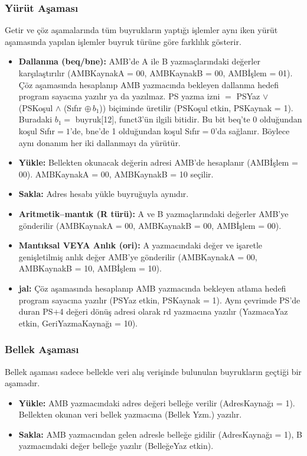 \subsubsection{Yürüt Aşaması}

Getir ve çöz aşamalarında tüm buyrukların yaptığı işlemler aynı iken yürüt aşamasında yapılan işlemler buyruk türüne göre farklılık gösterir.

\begin{itemize}
    \item \textbf{Dallanma (beq/bne):} AMB'de A ile B yazmaçlarındaki değerler karşılaştırılır (AMBKaynakA = 00, AMBKaynakB = 00, AMBİşlem = 01). Çöz aşamasında hesaplanıp AMB yazmacında bekleyen dallanma hedefi program sayacına yazılır ya da yazılmaz. PS yazma izni $=$ PSYaz $\lor$ (PSKoşul $\land$ (Sıfır $\oplus\, b_1$)) biçiminde üretilir (PSKoşul etkin, PSKaynak = 1). Buradaki $b_1 = $ buyruk[12], funct3'ün ilgili bitidir. Bu bit beq'te 0 olduğundan koşul Sıfır$=1$'de, bne'de 1 olduğundan koşul Sıfır$=0$'da sağlanır. Böylece aynı donanım her iki dallanmayı da yürütür.
    \item \textbf{Yükle:} Bellekten okunacak değerin adresi AMB'de hesaplanır (AMBİşlem = 00). AMBKaynakA = 00, AMBKaynakB = 10 seçilir.
    \item \textbf{Sakla:} Adres hesabı yükle buyruğuyla aynıdır.
    \item \textbf{Aritmetik--mantık (R türü):} A ve B yazmaçlarındaki değerler AMB'ye gönderilir (AMBKaynakA = 00, AMBKaynakB = 00, AMBİşlem = 00).
    \item \textbf{Mantıksal VEYA Anlık (ori):} A yazmacındaki değer ve işaretle genişletilmiş anlık değer AMB'ye gönderilir (AMBKaynakA = 00, AMBKaynakB = 10, AMBİşlem = 10).
    \item \textbf{jal:} Çöz aşamasında hesaplanıp AMB yazmacında bekleyen atlama hedefi program sayacına yazılır (PSYaz etkin, PSKaynak = 1). Aynı çevrimde PS'de duran PS$+$4 değeri dönüş adresi olarak rd yazmacına yazılır (YazmacaYaz etkin, GeriYazmaKaynağı = 10).
\end{itemize}

\subsubsection{Bellek Aşaması}

Bellek aşaması sadece bellekle veri alış verişinde bulunulan buyrukların geçtiği bir aşamadır.
\begin{itemize}
    \item \textbf{Yükle:} AMB yazmacındaki adres değeri belleğe verilir (AdresKaynağı = 1). Bellekten okunan veri bellek yazmacına (Bellek Yzm.) yazılır.
    \item \textbf{Sakla:} AMB yazmacından gelen adresle belleğe gidilir (AdresKaynağı = 1), B yazmacındaki değer belleğe yazılır (BelleğeYaz etkin).
\end{itemize}

